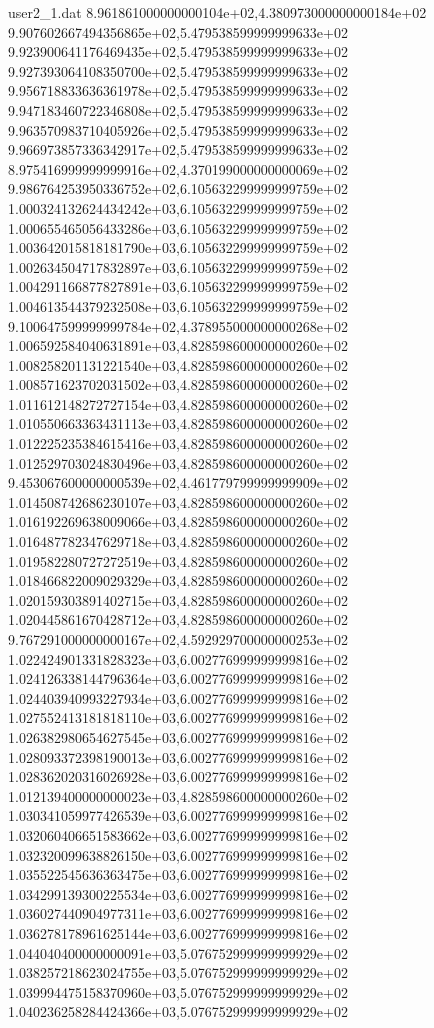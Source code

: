 \begin{filecontents}{user2_1.dat}
8.961861000000000104e+02,4.380973000000000184e+02
9.907602667494356865e+02,5.479538599999999633e+02
9.923900641176469435e+02,5.479538599999999633e+02
9.927393064108350700e+02,5.479538599999999633e+02
9.956718833636361978e+02,5.479538599999999633e+02
9.947183460722346808e+02,5.479538599999999633e+02
9.963570983710405926e+02,5.479538599999999633e+02
9.966973857336342917e+02,5.479538599999999633e+02
8.975416999999999916e+02,4.370199000000000069e+02
9.986764253950336752e+02,6.105632299999999759e+02
1.000324132624434242e+03,6.105632299999999759e+02
1.000655465056433286e+03,6.105632299999999759e+02
1.003642015818181790e+03,6.105632299999999759e+02
1.002634504717832897e+03,6.105632299999999759e+02
1.004291166877827891e+03,6.105632299999999759e+02
1.004613544379232508e+03,6.105632299999999759e+02
9.100647599999999784e+02,4.378955000000000268e+02
1.006592584040631891e+03,4.828598600000000260e+02
1.008258201131221540e+03,4.828598600000000260e+02
1.008571623702031502e+03,4.828598600000000260e+02
1.011612148272727154e+03,4.828598600000000260e+02
1.010550663363431113e+03,4.828598600000000260e+02
1.012225235384615416e+03,4.828598600000000260e+02
1.012529703024830496e+03,4.828598600000000260e+02
9.453067600000000539e+02,4.461779799999999909e+02
1.014508742686230107e+03,4.828598600000000260e+02
1.016192269638009066e+03,4.828598600000000260e+02
1.016487782347629718e+03,4.828598600000000260e+02
1.019582280727272519e+03,4.828598600000000260e+02
1.018466822009029329e+03,4.828598600000000260e+02
1.020159303891402715e+03,4.828598600000000260e+02
1.020445861670428712e+03,4.828598600000000260e+02
9.767291000000000167e+02,4.592929700000000253e+02
1.022424901331828323e+03,6.002776999999999816e+02
1.024126338144796364e+03,6.002776999999999816e+02
1.024403940993227934e+03,6.002776999999999816e+02
1.027552413181818110e+03,6.002776999999999816e+02
1.026382980654627545e+03,6.002776999999999816e+02
1.028093372398190013e+03,6.002776999999999816e+02
1.028362020316026928e+03,6.002776999999999816e+02
1.012139400000000023e+03,4.828598600000000260e+02
1.030341059977426539e+03,6.002776999999999816e+02
1.032060406651583662e+03,6.002776999999999816e+02
1.032320099638826150e+03,6.002776999999999816e+02
1.035522545636363475e+03,6.002776999999999816e+02
1.034299139300225534e+03,6.002776999999999816e+02
1.036027440904977311e+03,6.002776999999999816e+02
1.036278178961625144e+03,6.002776999999999816e+02
1.044040400000000091e+03,5.076752999999999929e+02
1.038257218623024755e+03,5.076752999999999929e+02
1.039994475158370960e+03,5.076752999999999929e+02
1.040236258284424366e+03,5.076752999999999929e+02

\end{filecontents}

